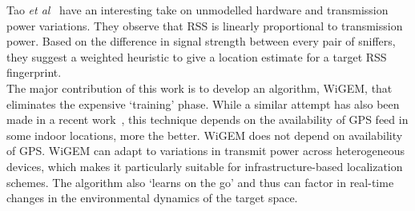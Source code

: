 Tao {\it et al}~\cite{Tao:2003:WLL:941311.941314} have an interesting take on unmodelled hardware and transmission power variations.  They observe that RSS is linearly proportional to transmission power. Based on the difference in signal strength between every pair of sniffers, they suggest a weighted heuristic to give a location estimate for a target RSS fingerprint.\\

 The major contribution of this work is to develop an algorithm, WiGEM, that eliminates the expensive `training' phase. 
While a similar attempt has also been made in a recent work~\cite{Chintalapudi:2010:ILW:1859995.1860016}, this technique depends on the availability of GPS feed in some indoor
locations, more the better. WiGEM does not depend on availability of GPS. 
%
WiGEM can adapt to variations in transmit power across heterogeneous devices, which makes it particularly suitable for infrastructure-based localization schemes. The algorithm also `learns on the go' and thus can factor in real-time changes in the environmental dynamics of the target space. 
